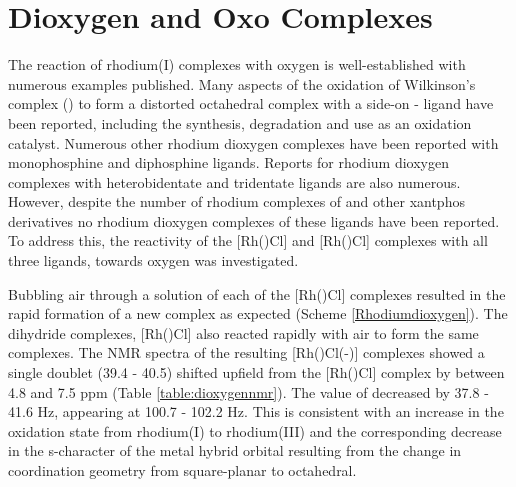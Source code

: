 
\section{Dioxygen and Oxo Complexes}

The reaction of rhodium(I) complexes with oxygen is well-established with numerous examples published.\cite{Valentine1973, Choy1972}  Many aspects of the oxidation of Wilkinson's complex () to form a distorted octahedral complex with a side-on - ligand have been reported, including the synthesis\cite{Baird1966, Atlay1980}, degradation\cite{Atlay1983} and use as an oxidation catalyst.\cite{Carlton1983, Read1985}  Numerous other rhodium dioxygen complexes have been reported with monophosphine \cite{Ahijado2005, Aresta1987, Bennett1977, Busetto1977, Gaal1977, Richter2000, Selke1993, Selke1995, Teets2012, Wakatsuki1990} and diphosphine\cite{Banwell2003, James1980,  Mague1977, McGinnety1969, Miller1975, Morvillo1986, Pettinari2002, Slack1979} ligands.  Reports for rhodium dioxygen complexes with heterobidentate\cite{Kashiwabara1997, Lindner1993, Perera1995, Yu2006} and tridentate\cite{Doux2003, Frech2006, Hayashi2013, Lanci2006, Vasapollo1981, Verat2008, Vigalok1996} ligands are also numerous.  However, despite the number of rhodium complexes of \Phxantphos{} and other xantphos derivatives no rhodium dioxygen complexes of these ligands have been reported.  To address this, the reactivity of 
the [Rh(\tBuxantphos)Cl] and [Rh(\tBuxantphos)Cl] complexes with all three ligands, towards oxygen was investigated.  

Bubbling air through a  solution of each of the [Rh(\tBuxantphosk)Cl] complexes resulted in the rapid formation of a new complex as expected (Scheme \ref{Rhodiumdioxygen}).  The dihydride complexes, [Rh(\tBuxantphosk)Cl] also reacted rapidly with air to form the same complexes.  The \phosphorus{} NMR spectra of the resulting [Rh(\tBuxantphos)Cl(\hapto{}-)] complexes showed a single doublet (39.4 - 40.5) shifted upfield from the [Rh(\tBuxantphos)Cl] complex by between 4.8 and 7.5 ppm (Table \ref{table:dioxygennmr}).  The value of \JRhP{} decreased by 37.8 - 41.6 Hz, appearing at 100.7 - 102.2 Hz.  This is consistent with an increase in the oxidation state from rhodium(I) to rhodium(III) and the corresponding decrease in the s-character of the metal hybrid orbital resulting from the change in coordination geometry from square-planar to octahedral.  

